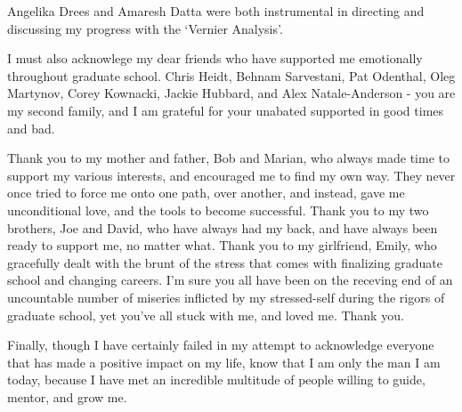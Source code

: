Angelika Drees and Amaresh Datta were both instrumental in directing and
discussing my progress with the `Vernier Analysis'.

I must also acknowlege my dear friends who have supported me emotionally
throughout graduate school. Chris Heidt, Behnam Sarvestani, Pat Odenthal, Oleg
Martynov, Corey Kownacki, Jackie Hubbard, and Alex Natale-Anderson - you are my
second family, and I am grateful for your unabated supported in good times and
bad. 

Thank you to my mother and father, Bob and Marian, who always made time to
support my various interests, and encouraged me to find my own way. They never
once tried to force me onto one path, over another, and instead, gave me
unconditional love, and the tools to become successful.  Thank you to my two
brothers, Joe and David, who have always had my back, and have always been
ready to support me, no matter what.  Thank you to my girlfriend, Emily, who
gracefully dealt with the brunt of the stress that comes with finalizing
graduate school and changing careers.  I'm sure you all have been on the
receving end of an uncountable number of miseries inflicted by my stressed-self
during the rigors of graduate school, yet you've all stuck with me, and loved
me. Thank you.

Finally, though I have certainly failed in my attempt to acknowledge everyone
that has made a positive impact on my life, know that I am only the man I am
today, because I have met an incredible multitude of people willing to guide,
mentor, and grow me.
